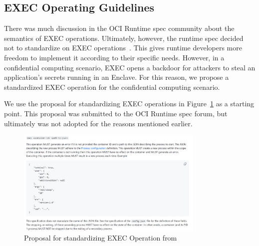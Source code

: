 \subsection{EXEC Operating Guidelines}

  There was much discussion in the OCI Runtime spec community about the semantics of EXEC operations. Ultimately, however, the runtime spec decided not to standardize on EXEC operations~\cite*{exec_semantics}. This gives runtime developers more freedom to implement it 
  according to their specific needs. However, in a confidential computing scenario, EXEC opens a backdoor for attackers to steal an application’s secrets running in an Enclave. For this reason, we propose a standardized EXEC operation for the 
  confidential computing scenario.

  We use the proposal for standardizing EXEC operations in Figure~\ref{fig:exec_propose} as a starting point. This proposal was submitted to the OCI Runtime spec forum, but ultimately was not adopted for the reasons mentioned earlier.

\begin{figure}[htp]
    \centering
    \includegraphics[width=0.8\textwidth]{images/exec_propose.png}
    \caption[Proposal for standardizing EXEC operation]{Proposal for standardizing EXEC Operation from~\cite*{exec_proposal} }
    \label{fig:exec_propose}
\end{figure}


